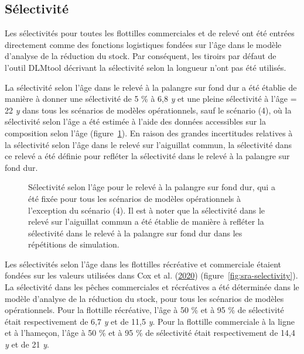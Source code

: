 \documentclass[11pt]{book}
\begin{document}
\subsection{Sélectivité}

Les sélectivités pour toutes les flottilles commerciales et de relevé ont été entrées directement comme des fonctions logistiques fondées sur l'âge dans le modèle d'analyse de la réduction du stock. Par conséquent, les tiroirs par défaut de l'outil DLMtool décrivant la sélectivité selon la longueur n'ont pas été utilisés.

La sélectivité selon l'âge dans le relevé à la palangre sur fond dur a été établie de manière à donner une sélectivité de 5 \% à 6,8 \emph{y} et une pleine sélectivité à l'âge = 22 \emph{y} dans tous les scénarios de modèles opérationnels, sauf le scénario (4), où la sélectivité selon l'âge a été estimée à l'aide des données accessibles sur la composition selon l'âge (figure~\ref{fig:HBLL-selectivity}). En raison des grandes incertitudes relatives à la sélectivité selon l'âge dans le relevé sur l'aiguillat commun, la sélectivité dans ce relevé a été définie pour refléter la sélectivité dans le relevé à la palangre sur fond dur.


\begin{figure}[htb]

{\centering {} 

}

\caption{Sélectivité selon l'âge pour le relevé à la palangre sur fond dur, qui a été fixée pour tous les scénarios de modèles opérationnels à l'exception du scénario (4). Il est à noter que la sélectivité dans le relevé sur l'aiguillat commun a été établie de manière à refléter la sélectivité dans le relevé à la palangre sur fond dur dans les répétitions de simulation.}\label{fig:HBLL-selectivity}
\end{figure}
Les sélectivités selon l'âge dans les flottilles récréative et commerciale étaient fondées sur les valeurs utilisées dans Cox et al. (\protect\hyperlink{ref-cox2020}{2020}) (figure~\ref{fig:sra-selectivity}). La sélectivité dans les pêches commerciales et récréatives a été déterminée dans le modèle d'analyse de la réduction du stock, pour tous les scénarios de modèles opérationnels. Pour la flottille récréative, l'âge à 50 \% et à 95 \% de sélectivité était respectivement de 6,7 \emph{y} et de 11,5 \emph{y}. Pour la flottille commerciale à la ligne et à l'hameçon, l'âge à 50 \% et à 95 \% de sélectivité était respectivement de 14,4 \emph{y} et de 21 \emph{y}.
\end{document}
